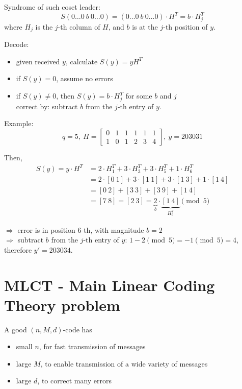 \documentclass{article}
\theoremstyle{definition}
\begin{document}
Syndrome of such coset leader:
$$S(0 \ldots 0 ~b~ 0 \ldots 0) = (0 \ldots 0 ~b~ 0 \ldots 0) \cdot H^T = b \cdot H_j^T$$
where $H_j$ is the $j$-th column of $H$, and $b$ is at the $j$-th position of $y$.

Decode:
\begin{itemize}
  \item[-] given received $y$, calculate $S(y)=y H^T$
  \item[-] if $S(y)=0$, assume no errors
  \item[-] if $S(y)\neq 0$, then $S(y) = b \cdot H_j^T$ for some $b$ and $j$\\
    correct by: subtract $b$ from the $j$-th entry of $y$.
\end{itemize}

Example:
$$q=5,~ H= \begin{bmatrix}0 & 1 & 1 & 1 & 1 & 1\\ 1 & 0 & 1 & 2 & 3 & 4 \end{bmatrix},~ y=203031$$

Then,
\begin{align*}
  S(y) = y \cdot H^T &= 2 \cdot H_1^T + 3 \cdot H_3^T + 3 \cdot H_5^T + 1 \cdot H_6^T\\
                     &= 2 \cdot [0~1] + 3 \cdot [1~1] + 3 \cdot [1~3] + 1 \cdot [1~4]\\
                     &= [0~2] + [3~3] + [3~9] + [1~4]\\
                     &= [7~8] = [2~3] = \underbrace{2}_{b} \cdot \underbrace{[1~4]}_{H_6^T} \pmod{5}
\end{align*}

$\Longrightarrow$ error is in position $6$-th, with magnitude $b=2$\\
\hspace*{2em} $\Longrightarrow$ subtract $b$ from the $j$-th entry of $y$: $1-2 \pmod{5} = -1 \pmod{5} = 4$,\\
\hspace*{2em} therefore $y'=203034$.

\section{MLCT - Main Linear Coding Theory problem}
A good $(n,M,d)$-code has
\begin{itemize}
  \item small $n$, for fast transmission of messages
  \item large $M$, to enable transmission of a wide variety of messages
  \item large $d$, to correct many errors
\end{itemize}
\end{document}
